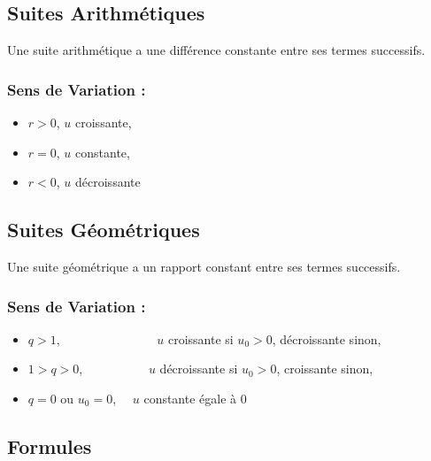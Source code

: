 \documentclass{report}
\begin{document}
    \subsection{Suites Arithmétiques}

      Une suite arithmétique a une différence constante entre ses termes successifs.

    \subsubsection*{Sens de Variation :}

      \begin{itemize}
        \item $r > 0$, $u$ croissante, 
        \item $r = 0$, $u$ constante,
        \item $r < 0$, $u$ décroissante
      \end{itemize} 


    \subsection{Suites Géométriques}

    Une suite géométrique a un rapport constant entre ses termes successifs.

    \subsubsection{Sens de Variation :} 
      \begin{itemize}
        \item $q > 1$, ~~~~~~~~~~~~~~~$u$ croissante si $u_0 > 0$, décroissante sinon, 
        \item $1 > q > 0$,~~~~~~~~~~ $u$ décroissante si $u_0 > 0$, croissante sinon,
        \item $q = 0$ ou $u_0 = 0$, ~~$u$ constante égale à 0
      \end{itemize} 


    \subsection{Formules}
\end{document}

